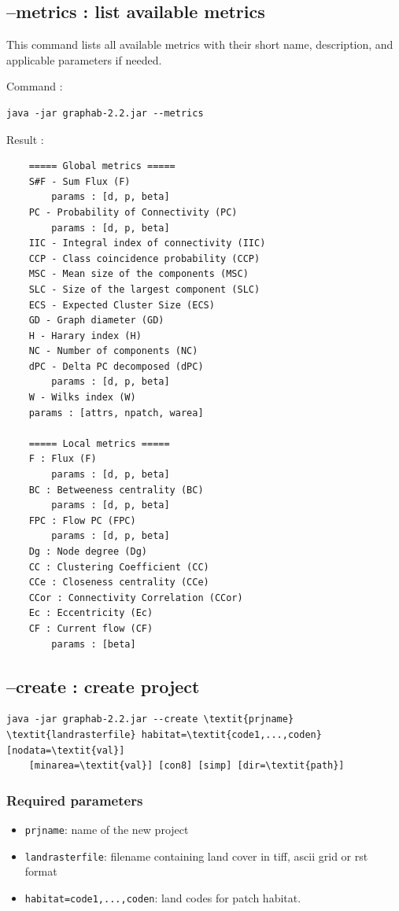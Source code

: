 \documentclass[a4paper,10pt]{report}
\begin{document}
\subsection{--metrics : list available metrics}
This command lists all available metrics with their short name, description, and applicable parameters if needed.

Command :
\begin{Verbatim}
java -jar graphab-2.2.jar --metrics
\end{Verbatim}
Result :
\begin{Verbatim}
	===== Global metrics =====
	S#F - Sum Flux (F)
		params : [d, p, beta]
	PC - Probability of Connectivity (PC)
		params : [d, p, beta]
	IIC - Integral index of connectivity (IIC)
	CCP - Class coincidence probability (CCP)
	MSC - Mean size of the components (MSC)
	SLC - Size of the largest component (SLC)
	ECS - Expected Cluster Size (ECS)
	GD - Graph diameter (GD)
	H - Harary index (H)
	NC - Number of components (NC)
	dPC - Delta PC decomposed (dPC)
		params : [d, p, beta]
	W - Wilks index (W)
	params : [attrs, npatch, warea]
	
	===== Local metrics =====
	F : Flux (F)
		params : [d, p, beta]
	BC : Betweeness centrality (BC)
		params : [d, p, beta]
	FPC : Flow PC (FPC)
		params : [d, p, beta]
	Dg : Node degree (Dg)
	CC : Clustering Coefficient (CC)
	CCe : Closeness centrality (CCe)
	CCor : Connectivity Correlation (CCor)
	Ec : Eccentricity (Ec)
	CF : Current flow (CF)
		params : [beta]
\end{Verbatim}

\subsection{--create : create project}

\begin{Verbatim}[commandchars=\\\{\}]
java -jar graphab-2.2.jar --create \textit{prjname} \textit{landrasterfile} habitat=\textit{code1,...,coden} [nodata=\textit{val}] 
	[minarea=\textit{val}] [con8] [simp] [dir=\textit{path}]
\end{Verbatim}

\subsubsection{Required parameters}
\begin{itemize}
	\item \verb|prjname|: name of the new project
	\item \verb|landrasterfile|: filename containing land cover in tiff, ascii grid or rst format
	\item \verb|habitat=code1,...,coden|: land codes for patch habitat.
\end{itemize}
\end{document}
